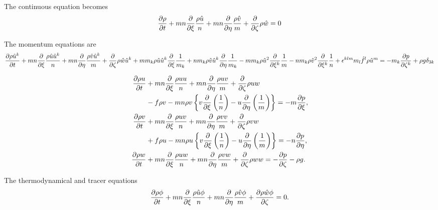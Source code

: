 \documentclass{book}
\begin{document}
The continuous equation becomes
\begin{equation}
  \pd{\rho}{t} + mn\pd{}{\xi}\frac{\rho \hat{u}}{n} + mn\pd{}{\eta}\frac{\rho \hat{v}}{m} + \pd{}{\zeta}\rho \hat{w} = 0
\end{equation}

The momentum equations are
\begin{equation}
  \pd{\rho\hat{u}^k}{t}
  + mn\pd{}{\xi}\frac{\rho \hat{u} \hat{u}^k}{n}
  + mn\pd{}{\eta}\frac{\rho \hat{v} \hat{u}^k}{m}
  + \pd{}{\zeta}\rho \hat{w} \hat{u}^k
  + m m_k \rho \hat{u} \hat{u}^k \pd{}{\xi}\frac{1}{m_k}
  + n m_k \rho \hat{v} \hat{u}^k \pd{}{\eta}\frac{1}{m_k}
  - m m_k \rho \hat{u}^2 \pd{}{\xi^k}\frac{1}{m}
  - n m_k \rho \hat{v}^2 \pd{}{\xi^k}\frac{1}{n}
  + \epsilon^{klm} m_l \hat{f}^l \rho \hat{u}^m
  = -m_k \pd{p}{\zeta^k} + \rho g \delta_{3k}
\end{equation}

\begin{align}
  \pd{\rho u}{t} &+ mn\pd{}{\xi}\frac{\rho uu}{n} + mn\pd{}{\eta}\frac{\rho uv}{m} + \pd{}{\zeta}\rho uw \\
  &- f\rho v - mn \rho v\left\{v\pd{}{\xi}\left(\frac{1}{n}\right) - u\pd{}{\eta}\left(\frac{1}{m}\right)\right\} = -m\pd{p}{\xi}, \\
  \pd{\rho v}{t} &+ mn\pd{}{\xi}\frac{\rho uv}{n} + mn\pd{}{\eta}\frac{\rho vv}{m} + \pd{}{\zeta}\rho vw \\
  &+f\rho u - mn \rho u\left\{v\pd{}{\xi}\left(\frac{1}{n}\right) - u\pd{}{\eta}\left(\frac{1}{m}\right)\right\} = -n\pd{p}{\eta}, \\
  \pd{\rho w}{t} &+ mn\pd{}{\xi}\frac{\rho uw}{n} + mn\pd{}{\eta}\frac{\rho vw}{m} + \pd{}{\zeta}\rho ww = -\pd{p}{\zeta} -\rho g.
\end{align}

The thermodynamical and tracer equations
\begin{equation}
  \pd{\rho \phi}{t} + mn\pd{}{\xi}\frac{\rho \hat{u}\phi}{n} + mn\pd{}{\eta}\frac{\rho \hat{v}\phi}{m} + \pd{\rho \hat{w}\phi}{\zeta} = 0.
\end{equation}
\end{document}
